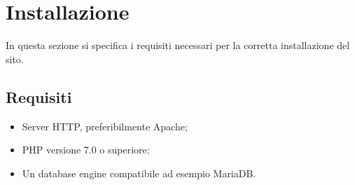 \section{Installazione}
In questa sezione si specifica i requisiti necessari per la corretta installazione del sito.
\subsection{Requisiti}
\begin{itemize}
\item Server HTTP, preferibilmente  Apache;
\item PHP versione 7.0 o superiore;
\item Un database engine compatibile ad esempio MariaDB.
\end{itemize}
